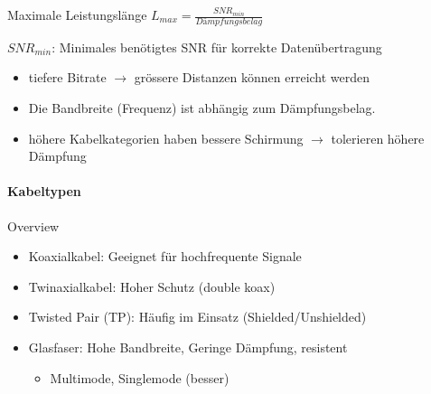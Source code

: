     \begin{concept}{Maximale Leistungslänge} $L_{max} = \frac{SNR_{min}}{Dämpfungsbelag}$

        \vspace{1mm}

        {\small $SNR_{min}$: Minimales benötigtes SNR für korrekte Datenübertragung}

        \vspace{1mm}

        \begin{itemize}
            \item tiefere Bitrate $\rightarrow$ grössere Distanzen können erreicht werden
            \item Die Bandbreite (Frequenz) ist abhängig zum Dämpfungsbelag.
            \item höhere Kabelkategorien haben bessere Schirmung $\rightarrow$ tolerieren höhere Dämpfung
        \end{itemize}
    \end{concept}

    

    \paragraph{Kabeltypen}
    \begin{concept}{Overview}
        \begin{itemize}
            \item Koaxialkabel: Geeignet für hochfrequente Signale
            \item Twinaxialkabel: Hoher Schutz (double koax)
            \item Twisted Pair (TP): Häufig im Einsatz (Shielded/Unshielded)
            \item Glasfaser: Hohe Bandbreite, Geringe Dämpfung, resistent
                \begin{itemize}
                    \item Multimode, Singlemode (besser)
                \end{itemize}
        \end{itemize}        
    \end{concept}

